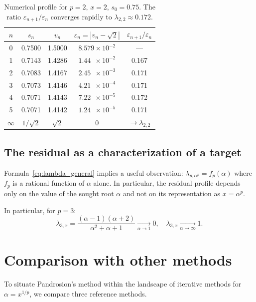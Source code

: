 \documentclass[11pt,a4paper]{article}
\theoremstyle{definition}
\newcommand{\eps}{\varepsilon}
\begin{document}
\begin{table}[h]
\centering
\begin{tabular}{ccccc}
\toprule
$n$ & $s_n$ & $v_n$ & $\eps_n = |v_n - \sqrt{2}|$ & $\eps_{n+1}/\eps_n$ \\
\midrule
0 & 0.7500 & 1.5000 & $8.579\times 10^{-2}$ & --- \\
1 & 0.7143 & 1.4286 & $1.44\phantom{0}\times 10^{-2}$ & 0.167 \\
2 & 0.7083 & 1.4167 & $2.45\phantom{0}\times 10^{-3}$ & 0.171 \\
3 & 0.7073 & 1.4146 & $4.21\phantom{0}\times 10^{-4}$ & 0.171 \\
4 & 0.7071 & 1.4143 & $7.22\phantom{0}\times 10^{-5}$ & 0.172 \\
5 & 0.7071 & 1.4142 & $1.24\phantom{0}\times 10^{-5}$ & 0.171 \\
$\infty$ & $1/\sqrt{2}$ & $\sqrt{2}$ & $0$ & $\to \lambda_{2,2}$ \\
\bottomrule
\end{tabular}
\caption{Numerical profile for $p=2$, $x=2$, $s_0 = 0.75$. The ratio $\eps_{n+1}/\eps_n$ converges rapidly to $\lambda_{2,2} \approx 0.172$.}
\end{table}

\subsection{The residual as a characterization of a target}

Formula~\eqref{eq:lambda_general} implies a useful observation: $\lambda_{p, \alpha^p} = f_p(\alpha)$ where $f_p$ is a rational function of $\alpha$ alone. In particular, the residual profile depends only on the value of the sought root $\alpha$ and not on its representation as $x = \alpha^p$.

In particular, for $p = 3$:
\[
  \lambda_{3,x} = \frac{(\alpha-1)(\alpha+2)}{\alpha^2+\alpha+1} \xrightarrow[\alpha \to 1]{} 0, \quad
  \lambda_{3,x} \xrightarrow[\alpha \to \infty]{} 1.
\]

\section{Comparison with other methods}
\label{sec:comparaisons}

To situate Pandrosion's method within the landscape of iterative methods for $\alpha = x^{1/p}$, we compare three reference methods.
\end{document}
